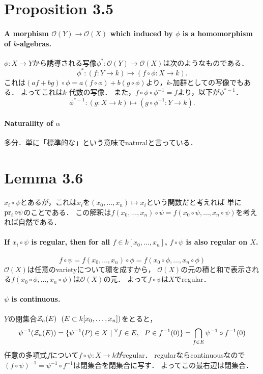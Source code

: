 \documentclass[a4paper]{jarticle}
\begin{document}
\section{Proposition 3.5}
    \paragraph{A morphism $\mathcal{O}(Y) \to \mathcal{O}(X)$ which induced by $\phi$ is a homomorphism of $k$-algebras.}
    $\phi:X \to Y$から誘導される写像$\phi^{\ast}: \mathcal{O}(Y) \to \mathcal{O}(X)$は次のようなものである．
    \[ \phi^{\ast}: (f:Y \to k) \mapsto (f \circ \phi: X \to k). \]
    これは$(af+bg) \circ \phi=a(f \circ \phi)+b(g \circ \phi)$より，$k$-加群としての写像でもある．
    よってこれは$k$-代数の写像．
    また，$f \circ \phi \circ \phi^{-1}=f$より，以下が$\phi^{\ast -1}$．
    \[ \phi^{\ast -1}: (g:X \to k) \mapsto (g \circ \phi^{-1}: Y \to k). \]

    \paragraph{Naturallity of $\alpha$}
    多分．単に「標準的な」という意味でnaturalと言っている．

\section{Lemma 3.6}
    $x_i \circ \psi$とあるが，これは$x_i$を$(x_0,\dots,x_n) \mapsto x_i$という関数だと考えれば
    単に$\operatorname{pr}_i \circ \psi$のことである．
    この解釈は$f(x_0,\dots,x_n) \circ \psi=f(x_0 \circ \psi,\dots,x_n \circ \psi)$を考えれば自然である．

    \paragraph{If $x_i \circ \psi$ is regular, then for all $f \in k[x_0,\dots,x_n]$, $f \circ \psi$ is also regular on $X$.}
    \[ f \circ \psi=f(x_0,\dots,x_n) \circ \phi=f(x_0 \circ \phi,\dots,x_n \circ \phi) \]
    $\mathcal{O}(X)$は任意のvarietyについて環を成すから，
    $\mathcal{O}(X)$の元の積と和で表示される$f(x_0 \circ \phi,\dots,x_n \circ \phi)$は$\mathcal{O}(X)$の元．
    よって$f \circ \psi$は$X$でregular．
    
    \paragraph{$\psi$ is continuous.}
    $Y$の閉集合$\mathcal{Z}_a(E)~~(E \subset k[x_0,\dots,x_n])$をとると，
    \[ \psi^{-1}(\mathcal{Z}_a(E))=\{\psi^{-1}(P) \in X ~|~ {}^{\forall} f \in E,~~ P \in f^{-1}(0) \}=\bigcap_{f \in E} \psi^{-1} \circ f^{-1}(0) \]
    任意の多項式$f$について$f \circ \psi:X \to k$がregular．
    regularならcontinuousなので$(f \circ \psi)^{-1}=\psi^{-1} \circ f^{-1}$は閉集合を閉集合に写す．
    よってこの最右辺は閉集合．
\end{document}
